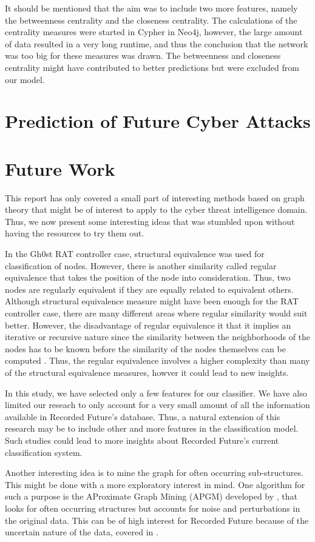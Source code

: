 It should be mentioned that the aim was to include two more features, namely the betweenness centrality and the closeness centrality. The calculations of the centrality measures were started in Cypher in Neo4j, however, the large amount of data resulted in a very long runtime, and thus the conclusion that the network was too big for these measures was drawn. The betweenness and closeness centrality might have contributed to better predictions but were excluded from our model.

\section{Prediction of Future Cyber Attacks}


\section{Future Work}
This report has only covered a small part of interesting methods based on graph theory that might be of interest to apply to the cyber threat intelligence domain. Thus, we now present some interesting ideas that was stumbled upon without having the resources to try them out. 

In the Gh0st RAT controller case, structural equivalence was used for classification of nodes. However, there is another similarity called regular equivalence that takes the position of the node into consideration. Thus, two nodes are regularly equivalent if they are equally related to equivalent others. Although structural equivalence measure might have been enough for the RAT controller case, there are many different areas where regular similarity would suit better. However, the disadvantage of regular equivalence it that it implies an iterative or recursive nature since the similarity between the neighborhoods of the nodes has to be known before the similarity of the nodes themselves can be computed \cite{leicht2006}. Thus, the regular equivalence involves a higher complexity than many of the structural equivalence measures, howver it could lead to new insights. 

In this study, we have selected only a few features for our classifier. We have also limited our reseach to only account for a very small amount of all the information available in Recorded Future's database. Thus, a natural extension of this research may be to include other and more features in the classification model. Such studies could lead to more insights about Recorded Future's current classification system.

Another interesting idea is to mine the graph for often occurring sub-structures. This might be done with a more exploratory interest in mind. One algorithm for such a purpose is the AProximate Graph Mining (APGM) developed by \citet{Jia2011}, that looks for often occurring structures but accounts for noise and perturbations in the original data. This can be of high interest for Recorded Future because of the uncertain nature of the data, covered in .
